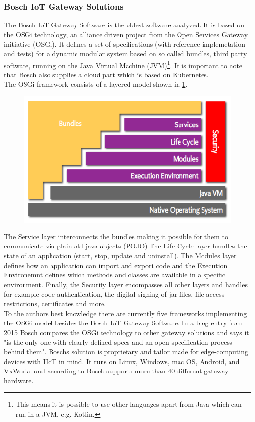 \subsubsection{Bosch IoT Gateway Solutions}
The Bosch IoT Gateway Software\cite{BoschIoT13:online} is the oldest software analyzed. It is based on the OSGi technology\cite{osgiDefintion25:online}, an alliance driven project from the Open Services Gateway initiative (OSGi). It defines a set of specifications (with reference implemetation and tests) for a dynamic modular system based on so called bundles, third party software, running on the Java Virtual Machine (JVM)\footnote{This means it is possible to use other languages apart from Java which can run in a JVM, e.g. Kotlin.}. It is important to note that Bosch also supplies a cloud part which is based on Kubernetes.\\
The OSGi framework consists of a layered model shown in \cref{fig:osgiLayerModel}. 
\begin{figure}[!ht]
    \centering
    \includegraphics[scale=0.8]{figures/layering-osgi.png}
    \label{fig:osgiLayerModel}
\end{figure}
The Service layer interconnects the bundles making it possible for them to communicate via plain old java objects (POJO).The Life-Cycle layer handles the state of an application (start, stop, update and uninstall). The Modules layer defines how an application can import and export code and the Execution Environemnt defines which methods and classes are available in a specific environment. Finally, the Security layer encompasses all other layers and handles for example code authentication, the digital signing of jar files, file access restrictions, certificates and more.\\
To the authors best knowledge there are currently five frameworks implementing the OSGi model besides the Bosch IoT Gateway Software\cite{BoschIoT13:online}. In a blog entry from 2015 Bosch compares the OSGi technology to other gateway solutions and says it "is the only one with clearly defined specs and an open specification process behind them"\cite{boschBlogOSGi69:online}. Boschs solution is proprietary and tailor made for edge-computing devices with IIoT in mind\cite{OSGiforIoTBlog27:online}. It runs on Linux, Windows, mac OS, Android, and VxWorks and according to Bosch supports more than 40 different gateway hardware\cite{BoschIoT13:online}. 

